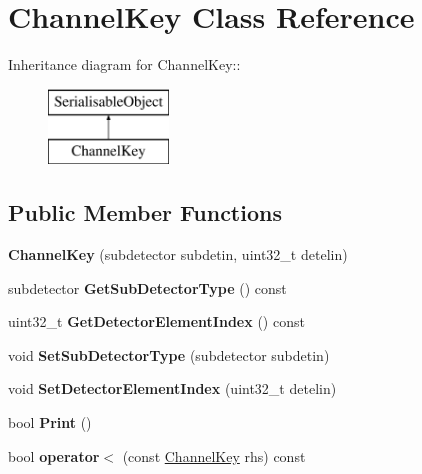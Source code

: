 \hypertarget{classChannelKey}{
\section{ChannelKey Class Reference}
\label{classChannelKey}
}
Inheritance diagram for ChannelKey::\begin{figure}[H]
\begin{center}
\leavevmode
\includegraphics[height=2cm]{classChannelKey}
\end{center}
\end{figure}
\subsection*{Public Member Functions}
\begin{DoxyCompactItemize}
\item 
\hypertarget{classChannelKey_a1b98b5ec38b5a372908869bec5e76885}{
{\bfseries ChannelKey} (subdetector subdetin, uint32\_\-t detelin)}
\label{classChannelKey_a1b98b5ec38b5a372908869bec5e76885}

\item 
\hypertarget{classChannelKey_a5b156478be91e4d58829661e9a63da13}{
subdetector {\bfseries GetSubDetectorType} () const }
\label{classChannelKey_a5b156478be91e4d58829661e9a63da13}

\item 
\hypertarget{classChannelKey_a2788a95997db38d5bf8075da6eb2d50c}{
uint32\_\-t {\bfseries GetDetectorElementIndex} () const }
\label{classChannelKey_a2788a95997db38d5bf8075da6eb2d50c}

\item 
\hypertarget{classChannelKey_a84b468bc66e943e8ad9b4102f8c8446d}{
void {\bfseries SetSubDetectorType} (subdetector subdetin)}
\label{classChannelKey_a84b468bc66e943e8ad9b4102f8c8446d}

\item 
\hypertarget{classChannelKey_a8727334520a49cba3d6a01a6727a361d}{
void {\bfseries SetDetectorElementIndex} (uint32\_\-t detelin)}
\label{classChannelKey_a8727334520a49cba3d6a01a6727a361d}

\item 
\hypertarget{classChannelKey_a7bb14ec44da38dd1152cf7912f7a607d}{
bool {\bfseries Print} ()}
\label{classChannelKey_a7bb14ec44da38dd1152cf7912f7a607d}

\item 
\hypertarget{classChannelKey_abcadfaf457add635aef1ec372e5340d7}{
bool {\bfseries operator$<$} (const \hyperlink{classChannelKey}{ChannelKey} rhs) const }
\label{classChannelKey_abcadfaf457add635aef1ec372e5340d7}

\end{DoxyCompactItemize}

